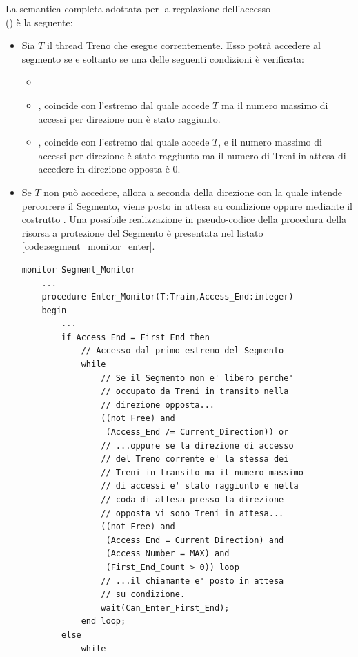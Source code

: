\begin{description}
		La semantica completa adottata per la regolazione dell'accesso \\() è la seguente:
		\begin{itemize}
			\item Sia $T$ il thread Treno che esegue correntemente. Esso potrà accedere al segmento se e soltanto se una delle seguenti condizioni è verificata:
				\begin{itemize}
					\item {}
					\item {},  coincide con l'estremo dal quale accede $T$ ma il numero massimo di accessi per direzione non è stato raggiunto.
					\item {},  coincide con l'estremo dal quale accede $T$, e il numero massimo di accessi per direzione è stato raggiunto ma il numero di Treni in attesa di accedere in direzione opposta è 0.
				\end{itemize}
			\item Se $T$ non può accedere, allora a seconda della direzione con la quale intende percorrere il Segmento, viene posto in attesa su condizione  oppure  mediante il costrutto . Una possibile realizzazione in pseudo-codice della procedura  della risorsa  a protezione del Segmento è presentata nel listato \ref{code:segment_monitor_enter}.
\begin{lstlisting}[caption=\small{Procedura protetta \ttt{Enter\_Monitor} per l'accesso al Segmento.},label=code:segment_monitor_enter]
monitor Segment_Monitor
	...
	procedure Enter_Monitor(T:Train,Access_End:integer) 
	begin
		...
		if Access_End = First_End then
			// Accesso dal primo estremo del Segmento
			while 
				// Se il Segmento non e' libero perche'
				// occupato da Treni in transito nella
				// direzione opposta...
				((not Free) and 
				 (Access_End /= Current_Direction)) or 
				// ...oppure se la direzione di accesso
				// del Treno corrente e' la stessa dei 
				// Treni in transito ma il numero massimo
				// di accessi e' stato raggiunto e nella
				// coda di attesa presso la direzione 
				// opposta vi sono Treni in attesa...
				((not Free) and 
				 (Access_End = Current_Direction) and 
				 (Access_Number = MAX) and 
				 (First_End_Count > 0)) loop
				// ...il chiamante e' posto in attesa
				// su condizione.
				wait(Can_Enter_First_End);
			end loop;
		else
			while

\end{lstlisting}
\end{itemize}
\end{description}
